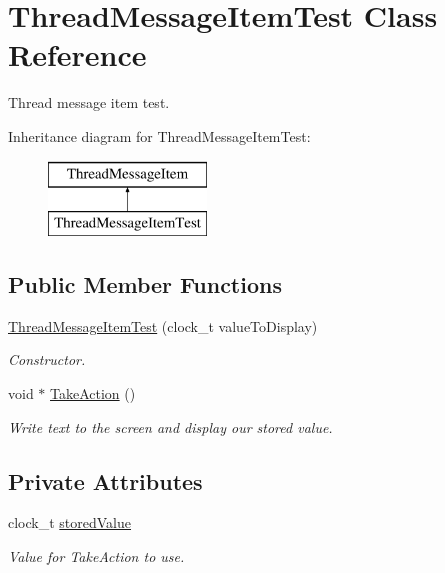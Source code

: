 \hypertarget{class_thread_message_item_test}{
\section{ThreadMessageItemTest Class Reference}
\label{class_thread_message_item_test}
}


Thread message item test.  


Inheritance diagram for ThreadMessageItemTest:\begin{figure}[H]
\begin{center}
\leavevmode
\includegraphics[height=2.000000cm]{class_thread_message_item_test}
\end{center}
\end{figure}
\subsection*{Public Member Functions}
\begin{DoxyCompactItemize}
\item 
\hyperlink{class_thread_message_item_test_a1b2b773980f60bca89f4a49f1c0d720b}{ThreadMessageItemTest} (clock\_\-t valueToDisplay)
\begin{DoxyCompactList}\small\item\em Constructor. \item\end{DoxyCompactList}\item 
void $\ast$ \hyperlink{class_thread_message_item_test_a8470d74447b104221782d379b4fd83a0}{TakeAction} ()
\begin{DoxyCompactList}\small\item\em Write text to the screen and display our stored value. \item\end{DoxyCompactList}\end{DoxyCompactItemize}
\subsection*{Private Attributes}
\begin{DoxyCompactItemize}
\item 
\hypertarget{class_thread_message_item_test_a2c1159032a1989a15333dae15eb2a542}{
clock\_\-t \hyperlink{class_thread_message_item_test_a2c1159032a1989a15333dae15eb2a542}{storedValue}}
\label{class_thread_message_item_test_a2c1159032a1989a15333dae15eb2a542}

\begin{DoxyCompactList}\small\item\em Value for TakeAction to use. \item\end{DoxyCompactList}\end{DoxyCompactItemize}


